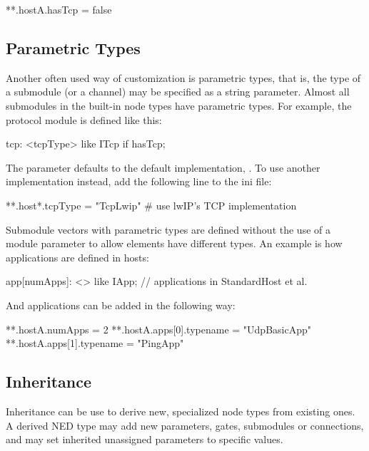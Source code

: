 \begin{inifile}
**.hostA.hasTcp = false
\end{inifile}

\subsection*{Parametric Types}

Another often used way of customization is parametric types, that is, the
type of a submodule (or a channel) may be specified as a string parameter.
Almost all submodules in the built-in node types have parametric types.
For example, the  protocol module is defined like this:

\begin{ned}
tcp: <tcpType> like ITcp if hasTcp;
\end{ned}

The  parameter defaults to the default implementation, .
To use another implementation instead, add the following line to the ini file:

\begin{inifile}
**.host*.tcpType = "TcpLwip"  # use lwIP's TCP implementation
\end{inifile}

Submodule vectors with parametric types are defined without the use of a
module parameter to allow elements have different types. An example
is how applications are defined in hosts:

\begin{ned}
app[numApps]: <> like IApp;  // applications in StandardHost et al.
\end{ned}

And applications can be added in the following way:

\begin{inifile}
**.hostA.numApps = 2
**.hostA.apps[0].typename = "UdpBasicApp"
**.hostA.apps[1].typename = "PingApp"
\end{inifile}

\subsection*{Inheritance}

Inheritance can be use to derive new, specialized node types from existing ones.
A derived NED type may add new parameters, gates, submodules or connections,
and may set inherited unassigned parameters to specific values.

